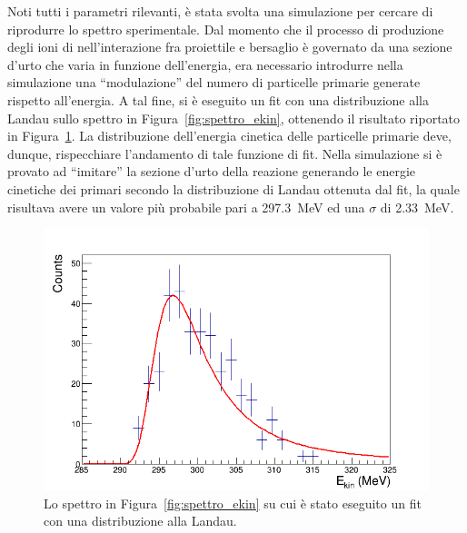 Noti tutti i parametri rilevanti, è stata svolta una simulazione per cercare di riprodurre lo spettro sperimentale. 
Dal momento che il processo di produzione degli ioni di  nell'interazione fra proiettile e bersaglio è governato da una sezione d'urto che varia in funzione dell'energia, era necessario introdurre nella simulazione una ``modulazione'' del numero di particelle primarie generate rispetto all'energia.
A tal fine, si è eseguito un fit con una distribuzione alla Landau sullo spettro in Figura~\ref{fig:spettro_ekin}, ottenendo il risultato riportato in Figura~\ref{fig:spettro_ekin_fit}.
La distribuzione dell'energia cinetica delle particelle primarie deve, dunque, rispecchiare l'andamento di tale funzione di fit.
Nella simulazione si è provato ad ``imitare'' la sezione d'urto della reazione generando le energie cinetiche dei primari secondo la distribuzione di Landau ottenuta dal fit, la quale risultava avere un valore più probabile pari a 297.3~MeV ed una $\sigma$ di 2.33~MeV.



\begin{figure} [!t]
	\centering
	\includegraphics[width=\textwidth, keepaspectratio]{Grafici_Tesi/Test/spettro_ekin_fit2.png}
	\caption{Lo spettro in Figura~\ref{fig:spettro_ekin} su cui è stato eseguito un fit con una distribuzione alla Landau.} \label{fig:spettro_ekin_fit}
\end{figure}

